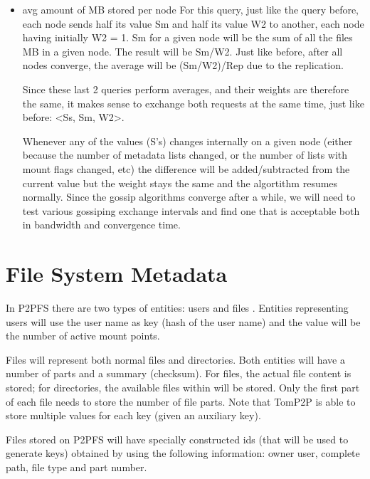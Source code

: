\documentclass[times,9pt,article]{llncs}
\begin{document}
\begin{itemize}
\item avg amount of MB stored per node
For this query, just like the query before, each node sends half its value Sm and 
half its value W2 to another, each node having initially W2 = 1. Sm for a given node
will be the sum of all the files MB in a given node. The result will be Sm/W2. Just
like before, after all nodes converge, the average will be (Sm/W2)/Rep due to the 
replication.

Since these last 2 queries perform averages, and their weights are therefore the same,
it makes sense to exchange both requests at the same time, just like before:
<Ss, Sm, W2>.

Whenever any of the values (S's) changes internally on a given node (either because
the number of metadata lists changed, or the number of lists with mount flags changed,
etc) the difference will be added/subtracted from the current value but the weight 
stays the same and the algortithm resumes normally.
Since the gossip algorithms converge after a while, we will need to test various
gossiping exchange intervals and find one that is acceptable both in bandwidth and
convergence time.

\end{itemize} 

\section{File System Metadata}

In P2PFS there are two types of entities: users and files . Entities representing
users will use the user name as key (hash of the user name) and the value will 
be the number of active mount points. 

Files will represent both normal files and directories. Both entities will have 
a number of parts and a summary (checksum). For files, the actual file content
is stored; for directories, the available files within will be stored. Only the
first part of each file needs to store the number of file parts. Note that 
TomP2P is able to store multiple values for each key (given an auxiliary key).   

Files stored on P2PFS will have specially constructed ids (that will be used to
generate keys) obtained by using the following information: owner user, complete 
path, file type and part number.
\end{document}
